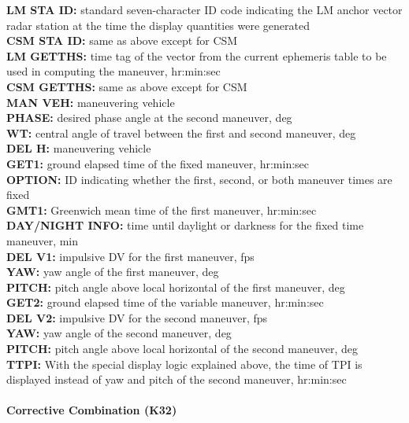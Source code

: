\documentclass[11pt]{article} %
\begin{document}
\textbf{LM STA ID:} standard seven-character ID code indicating the LM anchor vector radar station at the time the display quantities were generated\\
\textbf{CSM STA ID:} same as above except for CSM\\
\textbf{LM GETTHS:} time tag of the vector from the current ephemeris table to be used in computing the maneuver, hr:min:sec\\
\textbf{CSM GETTHS:} same as above except for CSM\\
\textbf{MAN VEH:} maneuvering vehicle\\
\textbf{PHASE:} desired phase angle at the second maneuver, deg\\
\textbf{WT:} central angle of travel between the first and second maneuver, deg\\
\textbf{DEL H:} maneuvering vehicle\\
\textbf{GET1:} ground elapsed time of the fixed maneuver, hr:min:sec\\
\textbf{OPTION:} ID indicating whether the first, second, or both maneuver times are fixed\\
\textbf{GMT1:} Greenwich mean time of the first maneuver, hr:min:sec\\
\textbf{DAY/NIGHT INFO:} time until daylight or darkness for the fixed time maneuver, min\\
\textbf{DEL V1:} impulsive DV for the first maneuver, fps\\
\textbf{YAW:} yaw angle of the first maneuver, deg\\
\textbf{PITCH:} pitch angle above local horizontal of the first maneuver, deg\\
\textbf{GET2:} ground elapsed time of the variable maneuver, hr:min:sec\\
\textbf{DEL V2:} impulsive DV for the second maneuver, fps\\
\textbf{YAW:} yaw angle of the second maneuver, deg\\
\textbf{PITCH:} pitch angle above local horizontal of the second maneuver, deg\\
\textbf{TTPI:} With the special display logic explained above, the time of TPI is displayed instead of yaw and pitch of the second maneuver, hr:min:sec\\
\newpage
\paragraph{Corrective Combination (K32)}\mbox{} \\
\end{document}
